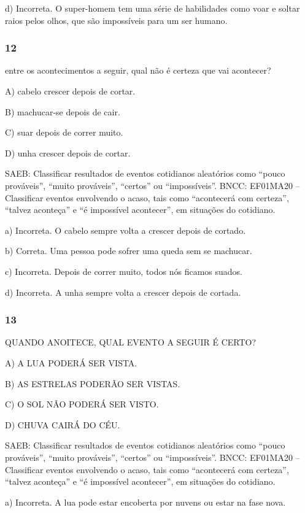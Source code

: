 \begin{itemize}
\begin{itemize}
d) Incorreta. O super-homem tem uma série de habilidades como voar e
soltar raios pelos olhos, que são impossíveis para um ser humano.

\subsubsection{12}\label{section-128}

entre os acontecimentos a seguir, qual não é certeza que vai
acontecer?

A) cabelo crescer depois de cortar.

B) machucar-se depois de cair.

C) suar depois de correr muito.

D) unha crescer depois de cortar.

SAEB: Classificar resultados de eventos cotidianos aleatórios como
``pouco prováveis'', ``muito prováveis'', ``certos'' ou ``impossíveis''.
BNCC: EF01MA20 -- Classificar eventos envolvendo o acaso, tais como
``acontecerá com certeza'', ``talvez aconteça'' e ``é impossível
acontecer'', em situações do cotidiano.

a) Incorreta. O cabelo sempre volta a crescer depois de cortado.

b) Correta. Uma pessoa pode sofrer uma queda sem se machucar.

c) Incorreta. Depois de correr muito, todos nós ficamos suados.

d) Incorreta. A unha sempre volta a crescer depois de cortada.

\subsubsection{13}\label{section-129}

QUANDO ANOITECE, QUAL EVENTO A SEGUIR É CERTO?

A) A LUA PODERÁ SER VISTA.

B) AS ESTRELAS PODERÃO SER VISTAS.

C) O SOL NÃO PODERÁ SER VISTO.

D) CHUVA CAIRÁ DO CÉU.

SAEB: Classificar resultados de eventos cotidianos aleatórios como
``pouco prováveis'', ``muito prováveis'', ``certos'' ou ``impossíveis''.
BNCC: EF01MA20 -- Classificar eventos envolvendo o acaso, tais como
``acontecerá com certeza'', ``talvez aconteça'' e ``é impossível
acontecer'', em situações do cotidiano.

a) Incorreta. A lua pode estar encoberta por nuvens ou estar na fase nova.


\end{itemize}
\end{itemize}
